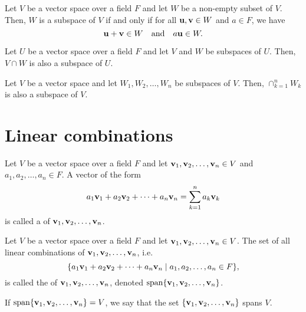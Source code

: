 \begin{thm}
Let $ V $ be a vector space over a field $ F $ and let $ W $ be a non-empty subset of $ V $. Then, $ W $ is a subspace of $ V $ if and only if for all $ \boldsymbol{\mathbf{u}},\boldsymbol{\mathbf{v}}\in W $ and $ a\in F $, we have
\begin{equation*}
    \boldsymbol{\mathbf{u}}+\boldsymbol{\mathbf{v}}\in W \quad\text{and}\quad a\boldsymbol{\mathbf{u}}\in W.
\end{equation*}
\end{thm}

\begin{thm}
Let $ U $ be a vector space over a field $ F $ and let $ V $ and $ W $ be subspaces of $ U $. Then, $ V\cap W $ is also a subspace of $ U $.
\end{thm}

\begin{cor}
Let $ V $ be a vector space and let $ W_1,W_2,\ldots,W_n $ be subspaces of $ V $. Then, $ \cap_{k=1}^n W_k $ is also a subspace of $ V $.
\end{cor}

\section{Linear combinations}

\begin{defn}
Let $ V $ be a vector space over a field $ F $ and let $ \boldsymbol{\mathbf{v}}_1,\boldsymbol{\mathbf{v}}_2,\ldots,\boldsymbol{\mathbf{v}}_n\in V $ and $ a_1,a_2,\ldots,a_n\in F $. A vector of the form
\begin{equation*}
    a_1\boldsymbol{\mathbf{v}}_1+a_2\boldsymbol{\mathbf{v}}_2+\cdots+a_n\boldsymbol{\mathbf{v}}_n=\sum_{k=1}^n a_k\boldsymbol{\mathbf{v}}_k
\end{equation*}
is called a  of $ \boldsymbol{\mathbf{v}}_1,\boldsymbol{\mathbf{v}}_2,\ldots,\boldsymbol{\mathbf{v}}_n $.
\end{defn}

\begin{defn}
Let $ V $ be a vector space over a field $ F $ and let $ \boldsymbol{\mathbf{v}}_1,\boldsymbol{\mathbf{v}}_2,\ldots,\boldsymbol{\mathbf{v}}_n\in V $. The set of all linear combinations of $ \boldsymbol{\mathbf{v}}_1,\boldsymbol{\mathbf{v}}_2,\ldots,\boldsymbol{\mathbf{v}}_n $, i.e.
\begin{equation*}
    \{a_1\boldsymbol{\mathbf{v}}_1+a_2\boldsymbol{\mathbf{v}}_2+\cdots+a_n\boldsymbol{\mathbf{v}}_n\mid a_1,a_2,\ldots,a_n\in F\},
\end{equation*}
is called the  of $ \boldsymbol{\mathbf{v}}_1,\boldsymbol{\mathbf{v}}_2,\ldots,\boldsymbol{\mathbf{v}}_n $, denoted $ \operatorname{span}\{\boldsymbol{\mathbf{v}}_1,\boldsymbol{\mathbf{v}}_2,\ldots,\boldsymbol{\mathbf{v}}_n\} $.

If $ \operatorname{span}\{\boldsymbol{\mathbf{v}}_1,\boldsymbol{\mathbf{v}}_2,\ldots,\boldsymbol{\mathbf{v}}_n\}=V $, we say that the set $ \{\boldsymbol{\mathbf{v}}_1,\boldsymbol{\mathbf{v}}_2,\ldots,\boldsymbol{\mathbf{v}}_n\} $ spans $ V $.
\end{defn}

